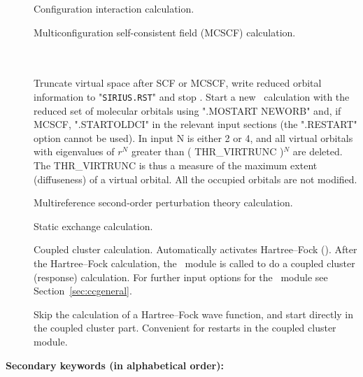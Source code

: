 \begin{description}
\item[]
  Configuration interaction calculation.

\item[]
  Multiconfiguration self-consistent field (MCSCF) calculation.

\item[] \ \\
   \\
  Truncate virtual space after SCF or MCSCF, write reduced orbital information to 
  "\verb|SIRIUS.RST|" and stop \dalton. Start a new \dalton\ calculation with the
  reduced set of molecular orbitals using ".MOSTART NEWORB" and, if MCSCF, ".STARTOLDCI"
  in the relevant input sections (the ".RESTART" option cannot be used).
  In input N is either 2 or 4, and all virtual orbitals with eigenvalues of
  $r^N$ greater than ( THR\_VIRTRUNC )$^N$ are deleted.
  The THR\_VIRTRUNC is thus a measure of the maximum extent (diffuseness) of a virtual orbital.
  All the occupied orbitals are not modified.

\item[]
  Multireference second-order perturbation theory calculation.

\item[]
  Static exchange calculation.

\item[]
  Coupled cluster calculation. Automatically activates Hartree--Fock ().
  After the Hartree--Fock calculation,
  the \cc\ module is called to do a coupled cluster (response) calculation.
  For further input options for the \cc\ module see Section~\ref{sec:ccgeneral}. 

\item[] Skip the calculation of a Hartree--Fock wave
  function, and start directly in the coupled cluster part. Convenient
  for restarts in the coupled cluster module.

\end{description}

{\bf Secondary keywords (in alphabetical order): }

